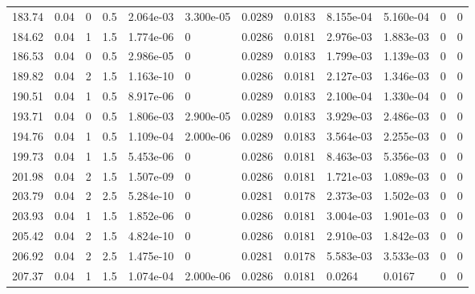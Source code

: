 \documentclass[preview]{standalone}
\begin{document}
{{{\begin{tabular}{L{1.2cm}C{1.2cm} C{0.3cm}C{0.5cm} C{1.4cm}C{1.4cm} C{1.4cm}C{1.4cm} C{1.6cm}C{1.6cm} C{1.6cm}C{1.6cm}}
  183.74  &  0.04  & 0     & 0.5 &  2.064e-03  & 3.300e-05  &  0.0289&   0.0183& 8.155e-04 & 5.160e-04   &  0 & 0  \\ 
  184.62  &  0.04  & 1     & 1.5 &  1.774e-06  & 0  &  0.0286&   0.0181& 2.976e-03 & 1.883e-03   &  0 & 0  \\ 
  186.53  &  0.04  & 0     & 0.5 &  2.986e-05  & 0  &  0.0289&   0.0183& 1.799e-03 & 1.139e-03   &  0 & 0  \\ 
  189.82  &  0.04  & 2     & 1.5 &  1.163e-10  & 0  &  0.0286&   0.0181& 2.127e-03 & 1.346e-03   &  0 & 0  \\ 
  190.51  &  0.04  & 1     & 0.5 &  8.917e-06  & 0  &  0.0289&   0.0183& 2.100e-04 & 1.330e-04   &  0 & 0  \\ 
  193.71  &  0.04  & 0     & 0.5 &  1.806e-03  & 2.900e-05  &  0.0289&   0.0183& 3.929e-03 & 2.486e-03   &  0 & 0  \\ 
  194.76  &  0.04  & 1     & 0.5 &  1.109e-04  & 2.000e-06  &  0.0289&   0.0183& 3.564e-03 & 2.255e-03   &  0 & 0  \\ 
  199.73  &  0.04  & 1     & 1.5 &  5.453e-06  & 0  &  0.0286&   0.0181& 8.463e-03 & 5.356e-03   &  0 & 0  \\ 
  201.98  &  0.04  & 2     & 1.5 &  1.507e-09  & 0  &  0.0286&   0.0181& 1.721e-03 & 1.089e-03   &  0 & 0  \\ 
  203.79  &  0.04  & 2     & 2.5 &  5.284e-10  & 0  &  0.0281&   0.0178& 2.373e-03 & 1.502e-03   &  0 & 0  \\ 
  203.93  &  0.04  & 1     & 1.5 &  1.852e-06  & 0  &  0.0286&   0.0181& 3.004e-03 & 1.901e-03   &  0 & 0  \\ 
  205.42  &  0.04  & 2     & 1.5 &  4.824e-10  & 0  &  0.0286&   0.0181& 2.910e-03 & 1.842e-03   &  0 & 0  \\ 
  206.92  &  0.04  & 2     & 2.5 &  1.475e-10  & 0  &  0.0281&   0.0178& 5.583e-03 & 3.533e-03   &  0 & 0  \\ 
  207.37  &  0.04  & 1     & 1.5 &  1.074e-04  & 2.000e-06  &  0.0286&   0.0181& 0.0264 & 0.0167   &  0 & 0  \\ 
\hline 
\end{tabular} 

}}}
\end{document}
